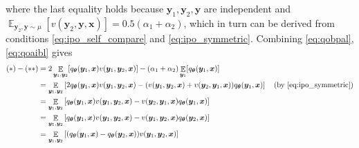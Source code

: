 \documentclass[11pt,a4paper]{article}
\begin{document}
where the last equality holds because $\bm{y}_1, \bm{y}_2, \bm{y}$ are independent and $ \mathop{\mathbb{E}}_{\bm{y}_2, \bm{y} \sim \mu}[v(\bm{y}_2, \bm{y}, \bm{x})] = 0.5(\alpha_1 + \alpha_2)$, which in turn can be derived from conditions \eqref{eq:ipo_self_compare} and \eqref{eq:ipo_symmetric}.
Combining \eqref{eq:qobpal}, \eqref{eq:qoaibl} gives
\begin{align*}
(*) - (**)
&= 2\mathop{\mathbb{E}}_{\bm{y}_1, \bm{y}_2}[q_{\boldsymbol \theta}(\bm{y}_1, \bm{x}) v(\bm{y}_1, \bm{y}_2, \bm{x})] - (\alpha_1 + \alpha_2)\mathop{\mathbb{E}}_{\bm{y}_1} [q_{\boldsymbol \theta}(\bm{y}_1, \bm{x}) ] \\
&= \mathop{\mathbb{E}}_{\bm{y}_1, \bm{y}_2} \left[2q_{\boldsymbol \theta}(\bm{y}_1, \bm{x}) v(\bm{y}_1, \bm{y}_2, \bm{x}) - (v(\bm{y}_1, \bm{y}_2, \bm{x})+v(\bm{y}_2, \bm{y}_1, \bm{x}))q_{\boldsymbol \theta}(\bm{y}_1, \bm{x} )  \right] \quad \text{(by \eqref{eq:ipo_symmetric})}\\
&= \mathop{\mathbb{E}}_{\bm{y}_1, \bm{y}_2} \left[q_{\boldsymbol \theta}(\bm{y}_1, \bm{x}) v(\bm{y}_1, \bm{y}_2, \bm{x}) - v(\bm{y}_2, \bm{y}_1, \bm{x})q_{\boldsymbol \theta}(\bm{y}_1, \bm{x} )  \right] \\
&= \mathop{\mathbb{E}}_{\bm{y}_1, \bm{y}_2} \left[q_{\boldsymbol \theta}(\bm{y}_1, \bm{x}) v(\bm{y}_1, \bm{y}_2, \bm{x}) - v(\bm{y}_1, \bm{y}_2, \bm{x})q_{\boldsymbol \theta}(\bm{y}_2, \bm{x} )  \right] \\
&= \mathop{\mathbb{E}}_{\bm{y}_1, \bm{y}_2} \left[(q_{\boldsymbol \theta}(\bm{y}_1, \bm{x})-q_{\boldsymbol \theta}(\bm{y}_2, \bm{x})) v(\bm{y}_1, \bm{y}_2, \bm{x}) \right]
\end{align*}
\end{document}
